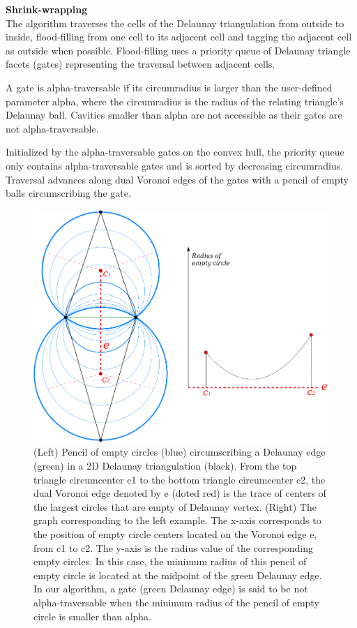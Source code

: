 \documentclass[12pt]{article}
\begin{document}
\textbf{Shrink-wrapping}\\
The algorithm traverses the cells of the Delaunay triangulation from outside to inside,
flood-filling from one cell to its adjacent cell and tagging the adjacent cell as
outside when possible. Flood-filling uses a priority queue of Delaunay triangle facets
(gates) representing the traversal between adjacent cells.

A gate is alpha-traversable if its circumradius is larger than the user-defined
parameter alpha, where the circumradius is the radius of the relating triangle's
Delaunay ball. Cavities smaller than alpha are not accessible as their gates are not
alpha-traversable.

Initialized by the alpha-traversable gates on the convex hull, the priority queue only
contains alpha-traversable gates and is sorted by decreasing circumradius. Traversal
advances along dual Voronoi edges of the gates with a pencil of empty balls
circumscribing the gate.

\begin{figure}[H]
    \centering
        \centering
        \includegraphics[width=\textwidth]{images/aw3_pencil.png}
        \caption{(Left) Pencil of empty circles (blue) circumscribing a Delaunay
        edge (green) in a 2D Delaunay triangulation (black). From the top triangle
        circumcenter c1 to the bottom triangle circumcenter c2, the dual Voronoi
         edge denoted by e (doted red) is the trace of centers of the largest circles
          that are empty of Delaunay vertex. (Right) The graph corresponding to the
          left example. The x-axis corresponds to the position of empty circle centers
           located on the Voronoi edge e, from c1 to c2. The y-axis is the radius
            value of the corresponding empty circles. In this case, the minimum
            radius of this pencil of empty circle is located at the midpoint of
            the green Delaunay edge. In our algorithm, a gate (green Delaunay edge)
             is said to be not alpha-traversable when the minimum radius of the pencil
              of empty circle is smaller than alpha. }
\end{figure}
\end{document}
